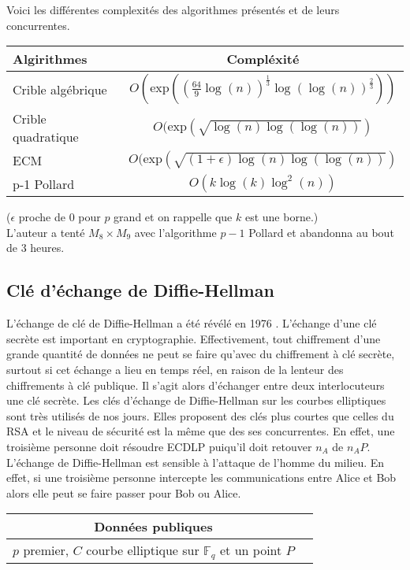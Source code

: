 \documentclass[a4paper]{article}
\begin{document}
Voici les différentes complexités des algorithmes présentés et de leurs concurrentes.
\begin{center}
\begin{tabular}{|l|c|}
  \hline
  Algirithmes & Compléxité  \\
  \hline
  Crible algébrique & $O(\text{exp}((\frac{64}{9}\log(n))^{\frac{1}{3}}\log(\log(n))^{\frac{2}{3}}))$  \\
  Crible quadratique & $O(\text{exp}(\sqrt{\log(n)\log(\log(n))})$  \\
  ECM & $O(\text{exp}(\sqrt{(1+\epsilon)\log(n)\log(\log(n))})$ \\
  p-1 Pollard & $O(k \log(k) \log^2(n))$ \\
  \hline
\end{tabular}
\end{center}
($\epsilon$ proche de $0$ pour $p$ grand et on rappelle que $k$ est une borne.) \\
L'auteur a tenté $M_{8}\times M_{9}$ avec l'algorithme $p-1$ Pollard et abandonna au bout de 3 heures.

\subsection{Clé d'échange de Diffie-Hellman}
\noindent L’échange de clé de Diffie-Hellman a été révélé en 1976 \cite{ref22}.
L’échange d’une clé secrète est important en cryptographie. Effectivement,  tout chiffrement d’une grande quantité de données ne peut se faire qu’avec du chiffrement à clé secrète, surtout si cet échange a lieu en temps réel, en raison de la lenteur des chiffrements à clé publique.
Il s’agit alors d’échanger entre deux interlocuteurs une clé secrète. 
Les clés d'échange de Diffie-Hellman sur les courbes elliptiques  sont très utilisés de nos jours. Elles proposent des clés plus courtes que celles du RSA et le niveau de sécurité est la même que des ses concurrentes.
En effet, une troisième personne doit résoudre ECDLP puiqu'il doit retouver $n_{A}$ de $n_{A}P$.
L'échange de Diffie-Hellman est sensible à l'attaque de l'homme du milieu. En effet, si une troisième personne intercepte les communications entre Alice et Bob alors elle peut se faire passer pour Bob ou Alice.
\begin{center}
\begin{tabular}{|c|c|} 
\hline

\multicolumn{1}{|c|}{Données publiques}  \\ 
 
\hline
$p$ premier, $C$ courbe elliptique sur $\mathbb{F}_{q}$ et un point $P$  \\
\hline
\end{tabular}
\end{center}
\end{document}
